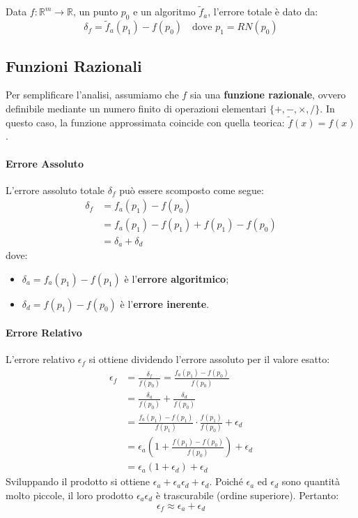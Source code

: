 \documentclass[a4paper,12pt]{article}
\begin{document}
	\begin{tcolorbox}[title=Definizione: Errore Totale]
		Data $f: \mathbb{R}^m \to \mathbb{R}$, un punto $p_0$ e un algoritmo $\tilde{f}_a$, l'errore totale è dato da:
		\[ \delta_f = \tilde{f}_a(p_1) - f(p_0) \quad \text{dove } p_1 = RN(p_0) \]
	\end{tcolorbox}
	\subsection{Funzioni Razionali}
	
	Per semplificare l'analisi, assumiamo che $f$ sia una \textbf{funzione razionale}, ovvero definibile mediante un numero finito di operazioni elementari $\{+, -, \times, /\}$. In questo caso, la funzione approssimata coincide con quella teorica: $\tilde{f}(x) = f(x)$.
	
	\paragraph{Errore Assoluto}
	L'errore assoluto totale $\delta_f$ può essere scomposto come segue:
	\begin{align*}
		\delta_f &= f_a(p_1) - f(p_0) \\
		&= f_a(p_1) - f(p_1) + f(p_1) - f(p_0) \\
		&= \delta_a + \delta_d
	\end{align*}
	dove:
	\begin{itemize}
		\item $\delta_a = f_a(p_1) - f(p_1)$ è l'\textbf{errore algoritmico};
		\item $\delta_d = f(p_1) - f(p_0)$ è l'\textbf{errore inerente}.
	\end{itemize}
	
	\paragraph{Errore Relativo}
	L'errore relativo $\epsilon_f$ si ottiene dividendo l'errore assoluto per il valore esatto:
	\begin{align*}
		\epsilon_f &= \frac{\delta_f}{f(p_0)} = \frac{f_a(p_1) - f(p_0)}{f(p_0)} \\
		&= \frac{\delta_a}{f(p_0)} + \frac{\delta_d}{f(p_0)} \\
		&= \frac{f_a(p_1) - f(p_1)}{f(p_1)} \cdot \frac{f(p_1)}{f(p_0)} + \epsilon_d \\
		&= \epsilon_a \left( 1 + \frac{f(p_1) - f(p_0)}{f(p_0)} \right) + \epsilon_d \\
		&= \epsilon_a (1 + \epsilon_d) + \epsilon_d
	\end{align*}
	Sviluppando il prodotto si ottiene $\epsilon_a + \epsilon_a\epsilon_d + \epsilon_d$. Poiché $\epsilon_a$ ed $\epsilon_d$ sono quantità molto piccole, il loro prodotto $\epsilon_a\epsilon_d$ è trascurabile (ordine superiore). Pertanto:
	\begin{equation}
		\epsilon_f \approx \epsilon_a + \epsilon_d
	\end{equation}
	
\end{document}
